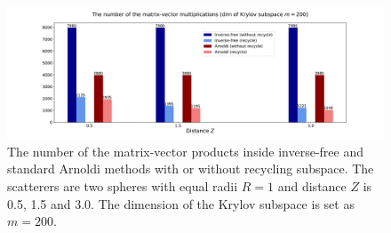 \begin{figure}[H]
    \centering
    \hspace*{-1.5cm}\includegraphics[scale = 0.4]{figures/matvec_200.pdf}
    \caption{The number of the matrix-vector products inside inverse-free and standard Arnoldi methods with or without recycling subspace. The scatterers are two spheres with equal radii $R = 1$ and distance $Z$ is 0.5, 1.5 and 3.0. The dimension of the Krylov subspace is set as $m = 200$.}
    \label{matvec200}
\end{figure}


